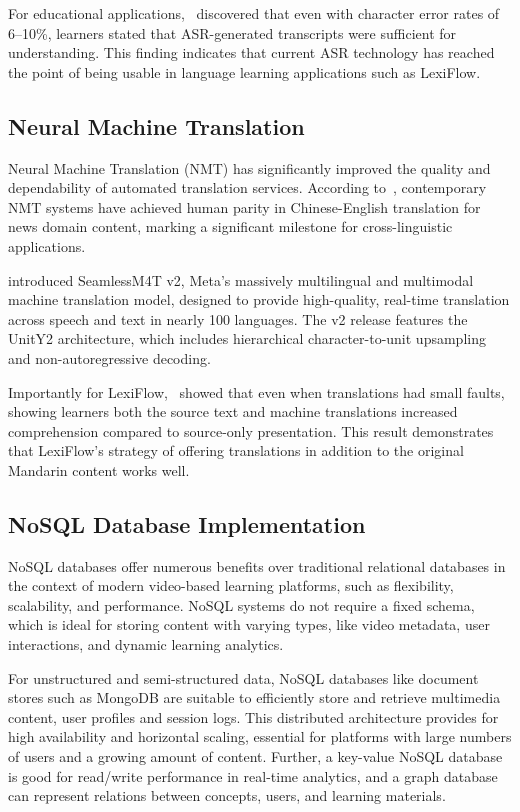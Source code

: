 \documentclass[oneside]{utmthesis}
\begin{document}
For educational applications,~\citet{sutomo2024} discovered that even with character error rates of 6--10\%, learners stated that ASR-generated transcripts were sufficient for understanding. This finding indicates that current ASR technology has reached the point of being usable in language learning applications such as LexiFlow.
\subsection{Neural Machine Translation}
Neural Machine Translation (NMT) has significantly improved the quality and dependability of automated translation services.  According to~\citet{hassan2018}, contemporary NMT systems have achieved human parity in Chinese-English translation for news domain content, marking a significant milestone for cross-linguistic applications.

\citet{barrault2023seamless} introduced SeamlessM4T v2, Meta's massively multilingual and multimodal machine translation model, designed to provide high-quality, real-time translation across speech and text in nearly 100 languages.  The v2 release features the UnitY2 architecture, which includes hierarchical character-to-unit upsampling and non-autoregressive decoding.

Importantly for LexiFlow,~\citet{gary2024} showed that even when translations had small faults, showing learners both the source text and machine translations increased comprehension compared to source-only presentation. This result demonstrates that LexiFlow's strategy of offering translations in addition to the original Mandarin content works well.

\subsection{NoSQL Database Implementation}
NoSQL databases offer numerous benefits over traditional relational databases in the context of modern video-based learning platforms, such as flexibility, scalability, and performance. NoSQL systems do not require a fixed schema, which is ideal for storing content with varying types, like video metadata, user interactions, and dynamic learning analytics.

For unstructured and semi-structured data, NoSQL databases like document stores such as MongoDB are suitable to efficiently store and retrieve multimedia content, user profiles and session logs. This distributed architecture provides for high availability and horizontal scaling, essential for platforms with large numbers of users and a growing amount of content. Further, a key-value NoSQL database is good for read/write performance in real-time analytics, and a graph database can represent relations between concepts, users, and learning materials.
\end{document}
